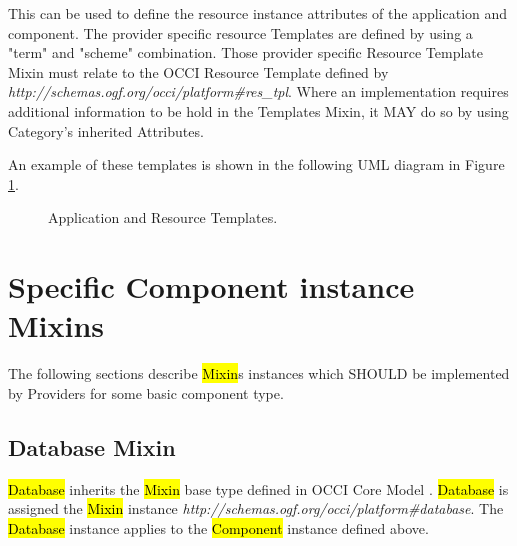 \documentclass[10pt,a4paper]{article}
\begin{document}
This can be used to define the resource instance attributes of the application and component. The provider specific resource Templates are defined by using a "term" and "scheme" combination. Those provider specific Resource Template Mixin must relate to the OCCI Resource Template defined by \textit{http://schemas.ogf.org/occi/platform\#res\_tpl}. Where an implementation requires additional information to be hold in the Templates Mixin, it MAY do so by using Category’s inherited Attributes.

An example of these templates is shown in the following UML diagram in Figure \ref{fig:templates}.

\begin{figure}[!h]
	{\centering {} \par}
	\caption{Application and Resource Templates.}
	\label{fig:templates}
\end{figure}

\section{Specific Component instance Mixins}
The following sections describe \hl{Mixin}s instances which SHOULD be implemented by Providers for some basic component type.

\subsection{Database Mixin}

\hl{Database} inherits the \hl{Mixin} base type defined in OCCI Core Model \cite{occi:core}. \hl{Database} is assigned the \hl{Mixin} instance \textit{http://schemas.ogf.org/occi/platform\#database}. The \hl{Database} instance applies to the \hl{Component} instance defined above.
\end{document}
